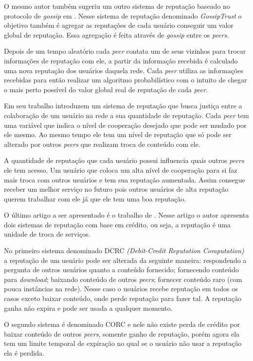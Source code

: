 \documentclass[12pt]{article}
\begin{document}
O mesmo autor também sugeriu um outro sistema de reputação  baseado no protocolo de \emph{gossip} em \cite{zhou2007gossip}. Nesse sistema de reputação denominado \emph{GossipTrust} o objetivo também é agregar as reputações de cada usuário conseguir um valor global de reputação. Essa agregação é feita através de \emph{gossip} entre os \emph{peers}.

Depois de um tempo aleatório cada \emph{peer} contata um de seus vizinhos para trocar informações de reputação com ele, a partir da informação recebida é calculado uma nova reputação dos usuários daquela rede. Cada \emph{peer} utiliza as informações recebidas para então realizar um algoritmo probabilístico com o intuito de chegar o mais perto possível do valor global real de reputação de cada \emph{peer}.

Em seu trabalho \cite{mortazavi2006cumulative} introduzem um sistema de reputação que busca justiça entre a colaboração de um usuário na rede a sua quantidade de reputação. Cada \emph{peer} tem uma variável que indica o nível de cooperação desejado que pode ser mudado por ele mesmo. Ao mesmo tempo ele tem um nível de reputação que só pode ser alterado por outros \emph{peers} que realizam troca de conteúdo com ele.

A quantidade de reputação que cada usuário possui influencia quais outros \emph{peers} ele tem acesso. Um usuário que coloca um alta nível de cooperação para si faz mais troca com outros usuários e tem sua reputação aumentada. Assim consegue receber um melhor serviço no futuro pois outros usuários de alta reputação querem trabalhar com ele já que ele tem uma boa reputação.

O último artigo a ser apresentado é o trabalho de \cite{gupta2003reputation}. Nesse artigo o autor apresenta dois  sistemas de reputação com base em crédito, ou seja, a reputação é uma unidade de troca de serviços.

No primeiro sistema denominado DCRC \emph{(Debit-Credit Reputation Computation)} a reputação de um usuário pode ser alterada da seguinte maneira: respondendo a pergunta de outros usuários quanto a conteúdo fornecido; fornecendo conteúdo para \emph{download}; baixando conteúdo de outros \emph{peers}; fornecer conteúdo raro (com pouca instâncias na rede). Nesse caso o usuários recebe reputação em todos os casos exceto baixar conteúdo, onde perde reputação para fazer tal. A reputação ganha não expira e pode ser usada a qualquer momento.

O segundo sistema é denominado CORC e nele não existe perda de crédito por baixar conteúdo de outros \emph{peers}, somente ganho de reputação, porém agora ela tem um limite temporal de expiração no qual se o usuário não usar a reputação ela é perdida. 
\end{document}
